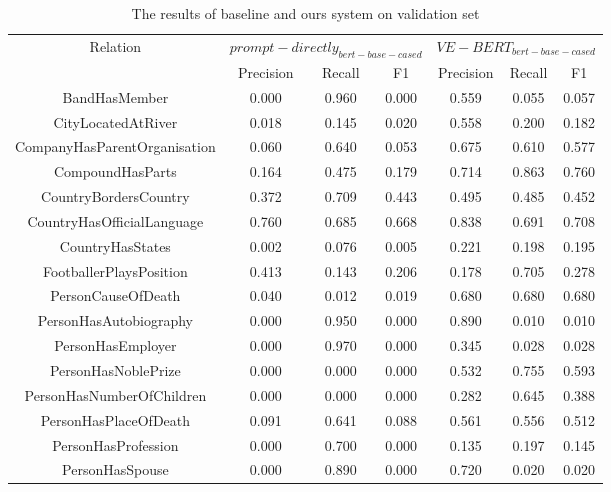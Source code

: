 \documentclass[]{ceurart}
\begin{document}
\begin{table}[h!]
    \centering
    \caption{The results of baseline and ours system on validation set }  \label{tab-detail}
    \begin{tabular}{|c|c|c|c|c|c|c|}
        \hline
        \multirow{2}{*}{Relation} & \multicolumn{3}{|c|}{$prompt-directly_{bert-base-cased}$} & \multicolumn{3}{|c|}{$VE-BERT_{bert-base-cased}$} \\\cline{2-7}
         & Precision & Recall & F1 & Precision & Recall & F1 \\\hline
BandHasMember                &  0.000& 0.960 & 0.000  &      0.559  &  0.055  &  0.057    \\  
CityLocatedAtRiver           &  0.018& 0.145 & 0.020  &      0.558  &  0.200  &  0.182    \\  
CompanyHasParentOrganisation &  0.060& 0.640 & 0.053  &      0.675  &  0.610  &  0.577    \\  
CompoundHasParts             &  0.164& 0.475 & 0.179  &      0.714  &  0.863  &  0.760    \\  
CountryBordersCountry        &  0.372& 0.709 & 0.443  &      0.495  &  0.485  &  0.452    \\  
CountryHasOfficialLanguage   &  0.760& 0.685 & 0.668  &      0.838  &  0.691  &  0.708    \\  
CountryHasStates             &  0.002& 0.076 & 0.005  &      0.221  &  0.198  &  0.195    \\  
FootballerPlaysPosition      &  0.413& 0.143 & 0.206  &      0.178  &  0.705  &  0.278    \\  
PersonCauseOfDeath           &  0.040& 0.012 & 0.019  &      0.680  &  0.680  &  0.680    \\  
PersonHasAutobiography       &  0.000& 0.950 & 0.000  &      0.890  &  0.010  &  0.010    \\  
PersonHasEmployer            &  0.000& 0.970 & 0.000  &      0.345  &  0.028  &  0.028    \\ 
PersonHasNoblePrize          &  0.000& 0.000 & 0.000  &      0.532  &  0.755  &  0.593    \\  
PersonHasNumberOfChildren    &  0.000& 0.000 & 0.000  &      0.282  &  0.645  &  0.388    \\  
PersonHasPlaceOfDeath        &  0.091& 0.641 & 0.088  &      0.561  &  0.556  &  0.512    \\ 
PersonHasProfession          &  0.000& 0.700 & 0.000  &      0.135  &  0.197  &  0.145    \\  
PersonHasSpouse              &  0.000& 0.890 & 0.000  &      0.720  &  0.020  &  0.020    \\  

\end{tabular}
\end{table}
\end{document}
